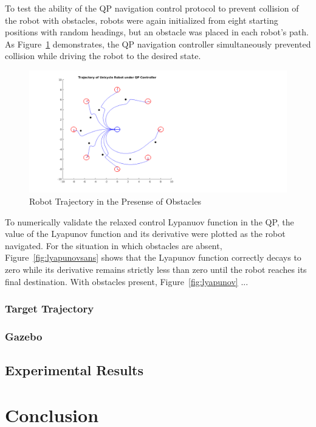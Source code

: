 \documentclass[journal]{IEEEtran}
\begin{document}
To test the ability of the QP navigation control protocol to prevent collision of the robot with obstacles, robots were again initialized from eight starting positions with random headings, but an obstacle was placed in each robot's path. As Figure~\ref{fig:octoplot} demonstrates, the QP navigation controller simultaneously prevented collision while driving the robot to the desired state.

\begin{figure}[h!]
\centering
\includegraphics[scale=0.4]{octoPlotProofEditSqur.png} 
\caption{Robot Trajectory in the Presense of Obstacles\label{fig:octoplot}} 
\end{figure}

To numerically validate the relaxed control Lypanuov function in the QP, the value of the Lyapunov function and its derivative were plotted as the robot navigated. For the situation in which obstacles are absent, Figure~\ref{fig:lyapunovsans} shows that the Lyapunov function correctly decays to zero while its derivative remains strictly less than zero until the robot reaches its final destination. With obstacles present, Figure~\ref{fig:lyapunov} ...
%
%
% 
\subsubsection{Target Trajectory}
\subsubsection{Gazebo}

\subsection{Experimental Results}
\section{Conclusion}



\end{document}
